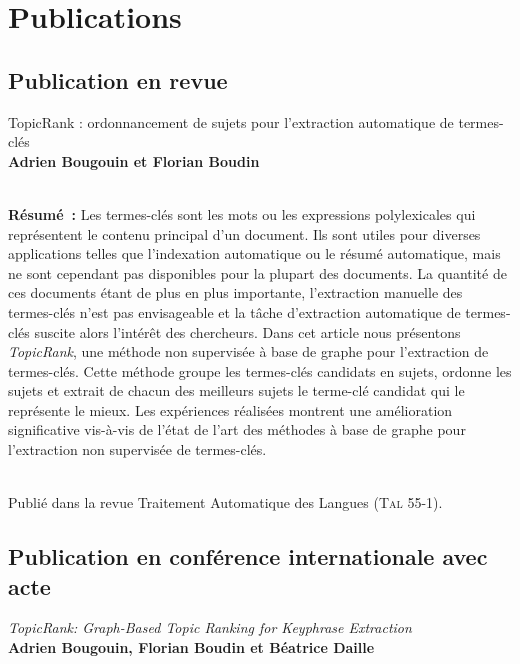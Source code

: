 \chapter*{Publications}
  \section*{Publication en revue}

  TopicRank : ordonnancement de sujets pour l'extraction automatique de
  termes-clés\\\textbf{Adrien Bougouin et Florian
  Boudin}\\\cite{bougouin2014topicrank}

  ~\\\textbf{Résumé~:}
  Les termes-clés sont les mots ou les expressions polylexicales qui
  représentent le contenu principal d'un document. Ils sont utiles pour diverses
  applications telles que l'indexation automatique ou le résumé automatique,
  mais ne sont cependant pas disponibles pour la plupart des documents. La
  quantité de ces documents étant de plus en plus importante, l'extraction
  manuelle des termes-clés n'est pas envisageable et la tâche d'extraction
  automatique de termes-clés suscite alors l'intérêt des chercheurs. Dans cet
  article nous présentons \textit{Topic\-Rank}, une méthode non supervisée à
  base de graphe pour l'extraction de termes-clés. Cette méthode groupe les
  termes-clés candidats en sujets, ordonne les sujets et extrait de chacun des
  meilleurs sujets le terme-clé candidat qui le représente le mieux. Les
  expériences réalisées montrent une amélioration significative vis-à-vis de
  l'état de l'art des méthodes à base de graphe pour l'extraction non supervisée
  de termes-clés.

  ~\\Publié dans la revue Traitement Automatique des Langues (\textsc{Tal}
  55-1).

  \section*{Publication en conférence internationale avec acte}

  \textit{TopicRank: Graph-Based Topic Ranking for Keyphrase
  Extraction}\\\textbf{Adrien Bougouin, Florian Boudin et Béatrice
  Daille}\\\cite{bougouin2013topicrank}


